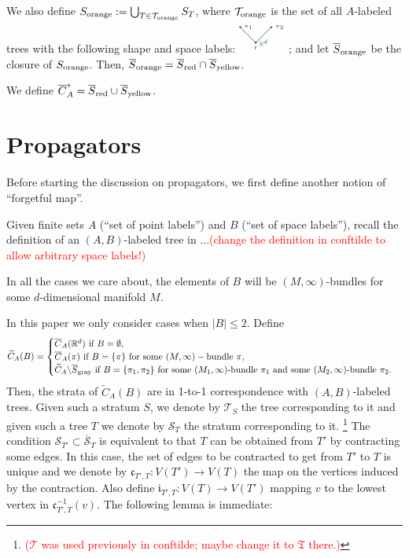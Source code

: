 \documentclass[11pt]{article}
\theoremstyle{definition}
\theoremstyle{remark}
\def\wt#1{\widetilde{#1}}
\def\ov#1{\overline{#1}}
\def\sgray{{\textnormal{gray}}}
\def\sred{{\textnormal{red}}}
\def\syellow{{\textnormal{yellow}}}
\def\sorange{{\textnormal{orange}}}
\def\R{\mathbb{R}}
\def\fc{\mathfrak{c}}
\def\fT{\mathfrak{T}}
\def\cT{\mathcal{T}}
\def\cS{\mathcal{S}}
\def\cmt#1{\textcolor{red}{(#1)}}
\def\tn#1{\textnormal{#1}}
\begin{document}
We also define
${S}_\sorange:=\bigcup_{T\in\cT_\sorange}S_T$, where $\cT_\sorange$ is the set of all $A$-labeled trees with the following shape and space labels: 
$\begin{tikzpicture}
\node [below] at (0,0) {\tiny{r}};  
\node [right, black!60!green] at (0,0) {\tiny{$\R^d$}};
\node [right, black!60!green] at (-0.5,0.5) {\tiny{$\pi_1$}};
\node [right, black!60!green] at (0.5,0.5) {\tiny{$\pi_2$}};
\draw [fill] (0,0) circle [radius=0.02];
\draw [fill] (-0.5,0.5) circle [radius=0.02];
\draw [fill] (0.5,0.5) circle [radius=0.02];
\draw (-0.5,0.5) -- (0,0) -- (0.5,0.5);
\end{tikzpicture}$;
and let $\ov{S}_\sorange$ be the closure of $S_\sorange$. Then, $\ov{S}_\sorange=\ov{S}_\sred\cap\ov{S}_\syellow$. 

We define $\ov{C}^*_A=\ov{S}_\sred\cup\ov{S}_\syellow$.


\section{Propagators}\label{propagator_sec}

Before starting the discussion on propagators, we first define another notion of ``forgetful map''. 

Given finite sets $A$ (``set of point labels'') and $B$ (``set of space labels''), recall the definition of an $(A,B)$-labeled tree in ...\textcolor{red}{(change the definition in conftilde to allow arbitrary space labels!)}

In all the cases we care about, the elements of $B$ will be $(M,\infty)$-bundles for some $d$-dimensional manifold $M$. 

In this paper we only consider cases when $|B|\le2$. 
Define 
$$\wt{C}_{A}(B)=\begin{cases}
\ov{C}_A(\R^d)\tn{ if }B=\emptyset,\\
\ov{C}_A(\pi)\tn{ if }B=\{\pi\}\tn{ for some }(M,\infty)-\tn{bundle }\pi,\\
\wt{C}_A\backslash\ov{S}_\sgray\tn{ if }B=\{\pi_1,\pi_2\}\tn{ for some }(M_1,\infty)\tn{-bundle }\pi_1\tn{ and some }(M_2,\infty)\tn{-bundle }\pi_2.
\end{cases}$$
Then, the strata of $\wt{C}_A(B)$ are in 1-to-1 correspondence with $(A,B)$-labeled trees. 
Given such a stratum $S$, we denote by $\cT_S$ the tree corresponding to it and given such a tree $T$ we denote by $\cS_T$ the stratum corresponding to it. \footnote{\cmt{$\cT$ was used previously in conftilde; maybe change it to $\fT$ there.}}
The condition $\cS_{T'}\subset\ov{\cS}_T$ is equivalent to that $T$ can be obtained from $T'$ by contracting some edges. In this case, the set of edges to be contracted to get from $T'$ to $T$ is unique and we denote by $\fc_{T',T}:V(T')\to V(T)$ the map on the vertices induced by the contraction. 
Also define 
$\mathfrak{i}_{T',T}:V(T)\to V(T')$
mapping $v$ to the lowest vertex in $\fc_{T',T}^{-1}(v)$. 
The following lemma is immediate: 
\end{document}
